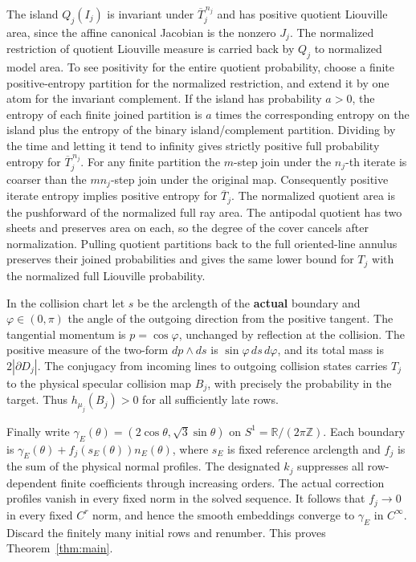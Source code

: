\documentclass[11pt]{article}
\begin{document}
The island \(Q_j(I_j)\) is invariant under \(\overline T_j^{\,n_j}\) and has
positive quotient Liouville area, since the affine canonical Jacobian is the
nonzero \(J_j\). The normalized restriction of quotient Liouville measure is
carried back by \(Q_j\) to normalized model area. To see positivity for the
entire quotient probability, choose a finite positive-entropy partition for the
normalized restriction, and extend it by one atom for the invariant complement.
If the island has probability \(a>0\), the entropy of each finite joined
partition is \(a\) times the corresponding entropy on the island plus the
entropy of the binary island/complement partition. Dividing by the time and
letting it tend to infinity gives strictly positive full probability entropy for
\(\overline T_j^{\,n_j}\). For any finite partition the \(m\)-step join under
the \(n_j\)-th iterate is coarser than the \(mn_j\)-step join under the original
map. Consequently positive iterate entropy implies positive entropy for
\(\overline T_j\). The normalized quotient area is the pushforward of the normalized
full ray area. The antipodal quotient has two sheets and preserves
area on each, so the degree of the cover cancels after normalization.
Pulling quotient partitions back to the full oriented-line
annulus preserves their joined probabilities and gives the same lower bound for
\(T_j\) with the normalized full Liouville probability.

In the collision chart let \(s\) be the arclength of the \textbf{actual}
boundary and \(\varphi\in(0,\pi)\) the angle of the outgoing direction from the
positive tangent. The tangential momentum is \(p=\cos\varphi\), unchanged by
reflection at the collision. The positive measure of the two-form
\(dp\wedge ds\) is \(\sin\varphi\,ds\,d\varphi\), and its total mass is
\(2|\partial D_j|\). The conjugacy from incoming lines to outgoing collision
states carries \(T_j\) to the physical specular collision map \(B_j\), with
precisely the probability in the target. Thus \(h_{\mu_j}(B_j)>0\) for all
sufficiently late rows.

Finally write \(\gamma_E(\theta)=(2\cos\theta,\sqrt3\sin\theta)\) on
\(S^1=\mathbb R/(2\pi\mathbb Z)\). Each boundary is
\(\gamma_E(\theta)+f_j(s_E(\theta))n_E(\theta)\), where \(s_E\) is fixed
reference arclength and \(f_j\) is the sum of the physical normal profiles. The
designated \(k_j\) suppresses all row-dependent finite coefficients through
increasing orders. The actual correction profiles vanish in every fixed norm in
the solved sequence. It follows that \(f_j\to0\) in every fixed \(C^r\) norm,
and hence the smooth embeddings converge to \(\gamma_E\) in \(C^\infty\).
Discard the finitely many initial rows and renumber. This proves
Theorem~\ref{thm:main}.
\end{document}
